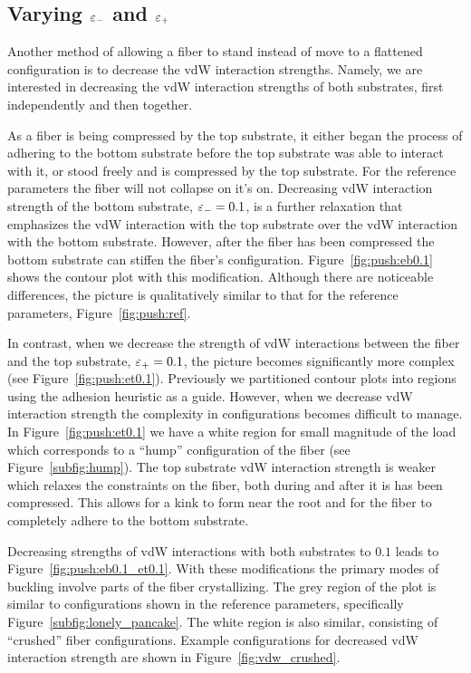 \subsection{Varying $\varepsilon_-$ and $\varepsilon_+$} \label{subsection:push:eps}

Another method of allowing a fiber to stand instead of move to a flattened configuration is to decrease the vdW interaction strengths. Namely, we are interested in decreasing the vdW interaction strengths of both substrates, first independently and then together.

As a fiber is being compressed by the top substrate, it either began the process of adhering to the bottom substrate before the top substrate was able to interact with it, or stood freely and is compressed by the top substrate. For the reference parameters the fiber will not collapse on it's on. Decreasing vdW interaction strength of the bottom substrate, $\varepsilon_-=0.1$, is a further relaxation that emphasizes the vdW interaction with the top substrate over the vdW interaction with the bottom substrate. However, after the fiber has been compressed the bottom substrate can stiffen the fiber's configuration. Figure~\ref{fig:push:eb0.1} shows the contour plot with this modification. Although there are noticeable differences, the picture is qualitatively similar to that for the reference parameters, Figure~\ref{fig:push:ref}.

In contrast, when we decrease the strength of vdW interactions between the fiber and the top substrate, $\varepsilon_+=0.1$, the picture becomes significantly more complex (see Figure~\ref{fig:push:et0.1}). Previously we partitioned contour plots into regions using the adhesion heuristic as a guide. However, when we decrease vdW interaction strength the complexity in configurations becomes difficult to manage. In Figure~\ref{fig:push:et0.1} we have a white region for small magnitude of the load which corresponds to a ``hump'' configuration of the fiber (see Figure~\ref{subfig:hump}). The top substrate vdW interaction strength is weaker which relaxes the constraints on the fiber, both during and after it is has been compressed. This allows for a kink to form near the root and for the fiber to completely adhere to the bottom substrate.

Decreasing strengths of vdW interactions with both substrates to $0.1$ leads to Figure~\ref{fig:push:eb0.1_et0.1}. With these modifications the primary modes of buckling involve parts of the fiber crystallizing. The grey region of the plot is similar to configurations shown in the reference parameters, specifically Figure~\ref{subfig:lonely_pancake}. The white region is also similar, consisting of ``crushed'' fiber configurations. Example configurations for decreased vdW interaction strength are shown in Figure~\ref{fig:vdw_crushed}.
	
